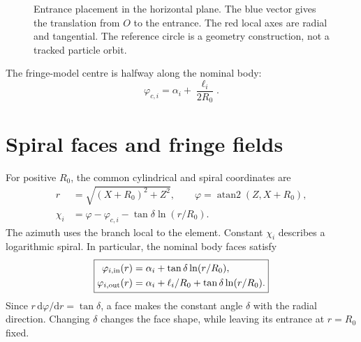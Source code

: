 \documentclass[11pt,a4paper]{article}
\newcommand{\vect}[1]{\boldsymbol{#1}}
\begin{document}
\begin{figure}[ht]
\centering
{}
\caption{Entrance placement in the horizontal plane. The blue vector gives the
translation from $O$ to the entrance. The red local axes are radial and tangential.
The reference circle is a geometry construction, not a tracked particle orbit.}
\label{fig:placement}
\end{figure}

The fringe-model centre is halfway along the nominal body:
\begin{equation}
 \varphi_{c,i}=\alpha_i+\frac{\ell_i}{2R_0}.
 \label{eq:centre}
\end{equation}

\section{Spiral faces and fringe fields}
For positive $R_0$, the common cylindrical and spiral coordinates are
\begin{equation}
 \begin{split}
 r&=\sqrt{(X+R_0)^2+Z^2},\qquad
 \varphi=\operatorname{atan2}(Z,X+R_0),\\
 \chi_i&=\varphi-\varphi_{c,i}-\tan\delta\ln(r/R_0).
 \end{split}
 \label{eq:spiral}
\end{equation}
The azimuth uses the branch local to the element. Constant $\chi_i$ describes a
logarithmic spiral. In particular, the nominal body faces satisfy
\begin{equation}
 \boxed{\begin{aligned}
 \varphi_{i,\rm in}(r)&=\alpha_i+\tan\delta\ln(r/R_0),\\
 \varphi_{i,\rm out}(r)&=\alpha_i+\ell_i/R_0+\tan\delta\ln(r/R_0).
 \end{aligned}}
 \label{eq:faces}
\end{equation}
Since $r\,\mathrm{d}\varphi/\mathrm{d}r=\tan\delta$, a face makes the constant
angle $\delta$ with the radial direction. Changing $\delta$ changes the face
shape, while leaving its entrance at $r=R_0$ fixed.
\end{document}
